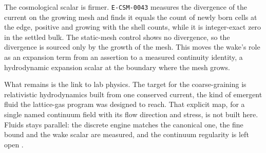The cosmological scalar is firmer. \texttt{E-CSM-0043} measures the divergence of the current on the growing mesh and finds it equals the count of newly born cells at the edge, positive and growing with the shell counts, while it is integer-exact zero in the settled bulk. The static-mesh control shows no divergence, so the divergence is sourced only by the growth of the mesh. This moves the wake's role as an expansion term from an assertion to a measured continuity identity, a hydrodynamic expansion scalar at the boundary where the mesh grows.

What remains is the link to lab physics. The target for the coarse-graining is relativistic hydrodynamics built from one conserved current, the kind of emergent fluid the lattice-gas program was designed to reach. That explicit map, for a single named continuum field with its flow direction and stress, is not built here. Fluids stays parallel: the discrete engine matches the canonical one, the fine bound and the wake scalar are measured, and the continuum regularity is left open \cite{cluesurf2026repo}.
